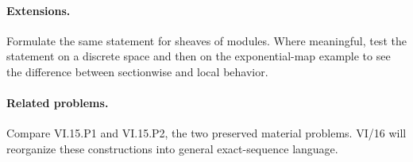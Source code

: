 \paragraph{Extensions.}
Formulate the same statement for sheaves of modules.  Where meaningful, test the statement on a discrete space and then on the exponential-map example to see the difference between sectionwise and local behavior.

\paragraph{Related problems.}
Compare VI.15.P1 and VI.15.P2, the two preserved material problems.  VI/16 will reorganize these constructions into general exact-sequence language.
\fi

